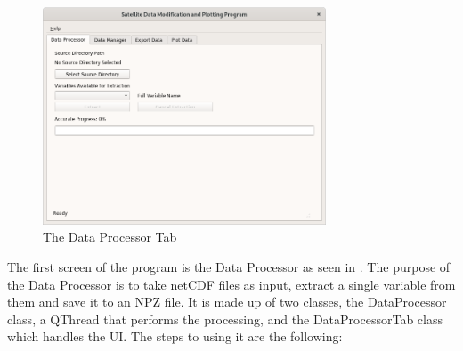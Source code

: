 \documentclass[../00_main.tex]{subfiles}
\begin{document}
\begin{figure}[H]
    \center
    \includegraphics[width=0.75\textwidth]{../graphics/dp01}
    \caption{The Data Processor Tab}
    \label{dp01}
\end{figure}
The first screen of the program is the Data Processor as seen in .
The purpose of the Data Processor is to take netCDF files as input, extract
a single variable from them and save it to an NPZ file. It is made up of two
classes, the DataProcessor class, a QThread that performs the processing, and 
the DataProcessorTab class which handles the UI. The steps to using it are the 
following:
\end{document}
